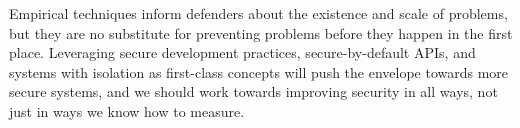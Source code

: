 Empirical techniques inform defenders about the existence and scale of
problems, but they are no substitute for preventing problems before they
happen in the first place. Leveraging secure development practices,
secure-by-default APIs, and systems with isolation as first-class concepts 
will push the envelope towards more secure systems, and we should work towards
improving security in all ways, not just in ways we know how to measure.




